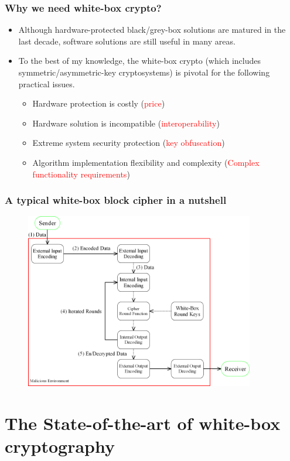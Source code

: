 \documentclass{beamer}
\begin{document}
\frame
{
\frametitle{Why we need white-box crypto?}
\begin{itemize}
\setlength{\itemsep}{12pt}
\item Although hardware-protected black/grey-box solutions are matured in the last decade, software solutions are still useful in many areas.

\item To the best of my knowledge, the white-box crypto (which includes symmetric/asymmetric-key cryptosystems) is pivotal for the following practical issues.
\begin{itemize}
\setlength{\itemsep}{12pt}
\item Hardware protection is costly (\textcolor{red}{price})
\item Hardware solution is incompatible (\textcolor{red}{interoperability})
\item Extreme system security protection (\textcolor{red}{key obfuscation})
\item Algorithm implementation flexibility and complexity (\textcolor{red}{Complex functionality requirements})
\end{itemize}
\end{itemize}

}

\frame
{
\frametitle{A typical white-box block cipher in a nutshell}
\begin{figure}[htbp]
\centering
  \includegraphics[width=10cm]{./pics/WBCrypto_Functional_Model.png}

\end{figure}

}

\section{The State-of-the-art of white-box cryptography}
\end{document}
